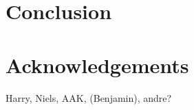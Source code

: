 \section{Conclusion}\label{sec:Conclusion}









\section{Acknowledgements}
Harry, Niels, AAK, (Benjamin), andre?




